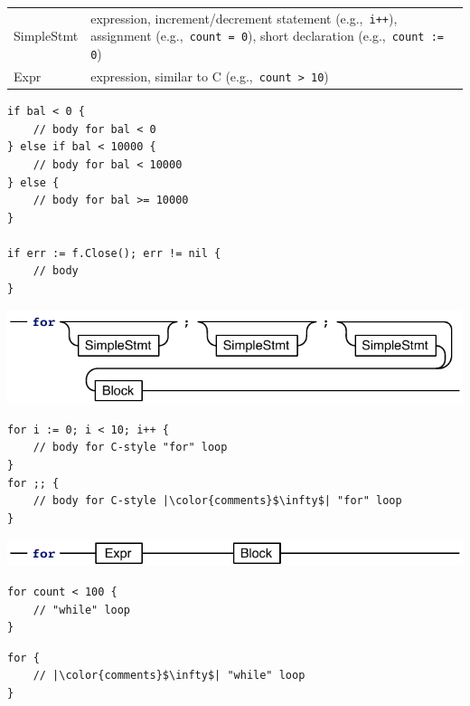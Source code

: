 \documentclass{article}
\begin{document}
\begin{multicols*}{3}
  \begin{tabular}{p{0.6in}p{2.4in}}
    SimpleStmt & expression, increment/decrement statement (e.g.,~\lstinline!i++!), assignment (e.g.,~\lstinline!count = 0!), short declaration (e.g.,~\lstinline!count := 0!)\\
    Expr & expression, similar to C (e.g.,~\lstinline!count > 10!)\\
  \end{tabular}

  \vspace{\baselineskip}
\begin{lstlisting}[frame=single,escapechar=|]
if bal < 0 {
    // body for bal < 0
} else if bal < 10000 {
    // body for bal < 10000
} else {
    // body for bal >= 10000
}

if err := f.Close(); err != nil {
    // body
}
\end{lstlisting}

  \filbreak
  \includegraphics[width=\linewidth]{for-3parts}

\begin{lstlisting}[frame=single,escapechar=|]
for i := 0; i < 10; i++ {
    // body for C-style "for" loop
}
for ;; {
    // body for C-style |\color{comments}$\infty$| "for" loop
}
\end{lstlisting}

  \filbreak
  \includegraphics[width=\linewidth]{for-1cond}

  \begin{minipage}{0.47\linewidth}
\begin{lstlisting}[frame=single,escapechar=|]
for count < 100 {
    // "while" loop
}
\end{lstlisting}
  \end{minipage}\hfill%
  \begin{minipage}{0.47\linewidth}
\begin{lstlisting}[frame=single,escapechar=|]
for {
    // |\color{comments}$\infty$| "while" loop
}
\end{lstlisting}
  \end{minipage}


\end{multicols*}
\end{document}
